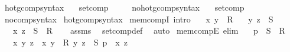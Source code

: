 \begin{isabellebody}
\isanewline
{}\isamarkupfalse%
\ hotg{\isacharunderscore}{\kern0pt}comp{\isacharunderscore}{\kern0pt}syntax\ \ \isamarkupfalse%
\ set{\isacharunderscore}{\kern0pt}comp\ {\isacharparenleft}{\kern0pt}\ {\isachardoublequoteopen}{\isasymcirc}{\isachardoublequoteclose}\ {}{}{\isacharparenright}{\kern0pt}\ \isamarkupfalse%
\isanewline
{}\isamarkupfalse%
\ no{\isacharunderscore}{\kern0pt}hotg{\isacharunderscore}{\kern0pt}comp{\isacharunderscore}{\kern0pt}syntax\ \ \isamarkupfalse%
\ set{\isacharunderscore}{\kern0pt}comp\ {\isacharparenleft}{\kern0pt}\ {\isachardoublequoteopen}{\isasymcirc}{\isachardoublequoteclose}\ {}{}{\isacharparenright}{\kern0pt}\ \isamarkupfalse%
\isanewline
{}\isamarkupfalse%
\ no{\isacharunderscore}{\kern0pt}comp{\isacharunderscore}{\kern0pt}syntax\isanewline
{}\isamarkupfalse%
\ hotg{\isacharunderscore}{\kern0pt}comp{\isacharunderscore}{\kern0pt}syntax\isanewline
\isanewline
{}\isamarkupfalse%
\ mem{\isacharunderscore}{\kern0pt}compI\ {\isacharbrackleft}{\kern0pt}intro{\isacharbang}{\kern0pt}{\isacharbrackright}{\kern0pt}{\isacharcolon}{\kern0pt}\isanewline
\ \ \ {\isachardoublequoteopen}{\isasymlangle}x{\isacharcomma}{\kern0pt}\ y{\isasymrangle}\ {\isasymin}\ R{\isachardoublequoteclose}\isanewline
\ \ \ {\isachardoublequoteopen}{\isasymlangle}y{\isacharcomma}{\kern0pt}\ z{\isasymrangle}\ {\isasymin}\ S{\isachardoublequoteclose}\isanewline
\ \ \ {\isachardoublequoteopen}{\isasymlangle}x{\isacharcomma}{\kern0pt}\ z{\isasymrangle}\ {\isasymin}\ S\ {\isasymcirc}\ R{\isachardoublequoteclose}\isanewline
%
\isadelimproof
\ \ %
\endisadelimproof
%
\isatagproof
{}\isamarkupfalse%
\ assms\ \isamarkupfalse%
\ set{\isacharunderscore}{\kern0pt}comp{\isacharunderscore}{\kern0pt}def\ \isamarkupfalse%
\ auto%
\endisatagproof
{\isafoldproof}%
%
\isadelimproof
\isanewline
%
\endisadelimproof
\isanewline
{}\isamarkupfalse%
\ mem{\isacharunderscore}{\kern0pt}compE\ {\isacharbrackleft}{\kern0pt}elim{\isacharbang}{\kern0pt}{\isacharbrackright}{\kern0pt}{\isacharcolon}{\kern0pt}\isanewline
\ \ \ {\isachardoublequoteopen}p\ {\isasymin}\ S\ {\isasymcirc}\ R{\isachardoublequoteclose}\isanewline
\ \ \ x\ y\ z\ \ {\isachardoublequoteopen}{\isasymlangle}x{\isacharcomma}{\kern0pt}\ y{\isasymrangle}\ {\isasymin}\ R{\isachardoublequoteclose}\ {\isachardoublequoteopen}{\isasymlangle}y{\isacharcomma}{\kern0pt}\ z{\isasymrangle}\ {\isasymin}\ S{\isachardoublequoteclose}\ {\isachardoublequoteopen}p\ {\isacharequal}{\kern0pt}\ {\isasymlangle}x{\isacharcomma}{\kern0pt}\ z{\isasymrangle}{\isachardoublequoteclose}\isanewline

\end{isabellebody}
